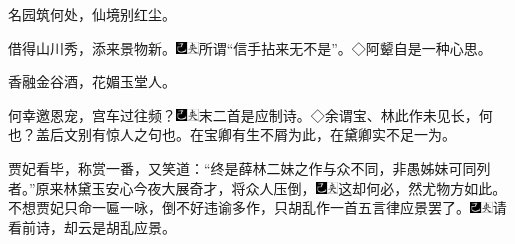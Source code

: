 名园筑何处，仙境别红尘。

借得山川秀，添来景物新。{\includegraphics[width=3mm]{../Images/00003}\includegraphics[width=3mm]{../Images/00012}\footnotesize \kaishu 所谓``信手拈来无不是''。◇阿颦自是一种心思。}

香融金谷酒，花媚玉堂人。

何幸邀恩宠，宫车过往频？{\includegraphics[width=3mm]{../Images/00003}\includegraphics[width=3mm]{../Images/00012}\footnotesize \kaishu 末二首是应制诗。◇余谓宝、林此作未见长，何也？盖后文别有惊人之句也。在宝卿有生不屑为此，在黛卿实不足一为。}

贾妃看毕，称赏一番，又笑道：``终是薛林二妹之作与众不同，非愚姊妹可同列者。''原来林黛玉安心今夜大展奇才，将众人压倒，{\includegraphics[width=3mm]{../Images/00003}\includegraphics[width=3mm]{../Images/00012}\footnotesize \kaishu 这却何必，然尤物方如此。}不想贾妃只命一匾一咏，倒不好违谕多作，只胡乱作一首五言律应景罢了。{\includegraphics[width=3mm]{../Images/00003}\includegraphics[width=3mm]{../Images/00012}\footnotesize \kaishu 请看前诗，却云是胡乱应景。}

